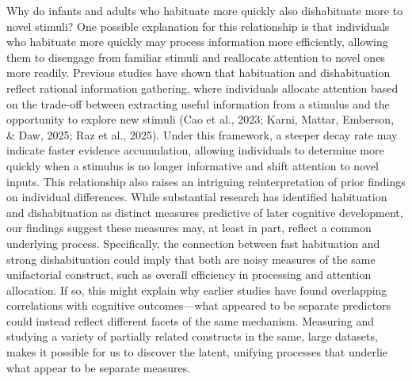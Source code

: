 \documentclass[10pt, letterpaper]{article}
\begin{document}
Why do infants and adults who habituate more quickly also dishabituate
more to novel stimuli? One possible explanation for this relationship is
that individuals who habituate more quickly may process information more
efficiently, allowing them to disengage from familiar stimuli and
reallocate attention to novel ones more readily. Previous studies have
shown that habituation and dishabituation reflect rational information
gathering, where individuals allocate attention based on the trade-off
between extracting useful information from a stimulus and the
opportunity to explore new stimuli (Cao et al., 2023; Karni, Mattar,
Emberson, \& Daw, 2025; Raz et al., 2025). Under this framework, a
steeper decay rate may indicate faster evidence accumulation, allowing
individuals to determine more quickly when a stimulus is no longer
informative and shift attention to novel inputs. This relationship also
raises an intriguing reinterpretation of prior findings on individual
differences. While substantial research has identified habituation and
dishabituation as distinct measures predictive of later cognitive
development, our findings suggest these measures may, at least in part,
reflect a common underlying process. Specifically, the connection
between fast habituation and strong dishabituation could imply that both
are noisy measures of the same unifactorial construct, such as overall
efficiency in processing and attention allocation. If so, this might
explain why earlier studies have found overlapping correlations with
cognitive outcomes---what appeared to be separate predictors could
instead reflect different facets of the same mechanism. Measuring and
studying a variety of partially related constructs in the same, large
datasets, makes it possible for us to discover the latent, unifying
processes that underlie what appear to be separate measures.
\end{document}
